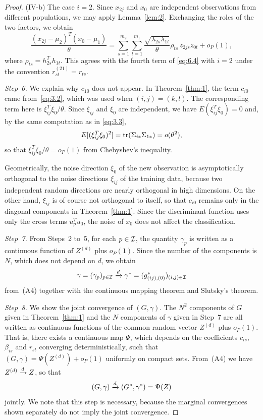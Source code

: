 \begin{proof}
(IV-b) The case $i=2$. Since $x_{2j}$ and $x_0$ are independent observations from
different populations, we may apply Lemma~\ref{lem:2}. Exchanging the roles of the
two factors, we obtain
\[
\frac{(x_{2j}-\mu_2)^T(x_0-\mu_1)}{\theta}
=\sum_{s=1}^{m_2}\sum_{t=1}^{m_1}\frac{\sqrt{\lambda_{2s}\lambda_{1t}}}{\theta}
\rho_{ts}\,z_{2js}z_{0t}+o_P(1),
\]
where $\rho_{ts}=h_{2s}^Th_{1t}$. This agrees with the fourth term of
\eqref{eq:6.4} with $i=2$ under the convention $r_{st}^{(21)}=r_{ts}$.

\textit{Step~6.} We explain why $c_{10}$ does not appear. In Theorem~\ref{thm:1},
the term $c_{i0}$ came from~\eqref{eq:3.2}, which was used when $(i,j)=(k,l)$. The
corresponding term here is $\xi_{ij}^T\xi_0/\theta$. Since $\xi_{ij}$ and $\xi_0$
are independent, we have $E(\xi_{ij}^T\xi_0)=0$ and, by the same computation as in
\eqref{eq:3.3},
\[
E[(\xi_{ij}^T\xi_0)^2]=\operatorname{tr}(\Sigma_{i*}\Sigma_{1*})=o(\theta^2),
\]
so that $\xi_{ij}^T\xi_0/\theta=o_P(1)$ from Chebyshev's inequality.

Geometrically, the noise direction $\xi_0$ of the new observation is asymptotically
orthogonal to the noise directions $\xi_{ij}$ of the training data, because two
independent random directions are nearly orthogonal in high dimensions. On the
other hand, $\xi_{ij}$ is of course not orthogonal to itself, so that $c_{i0}$
remains only in the diagonal components in Theorem~\ref{thm:1}. Since the
discriminant function uses only the cross terms $u_p^Tu_0$, the noise of $x_0$
does not affect the classification.

\textit{Step~7.} From Steps~2 to~5, for each $p\in\mathcal{I}$, the quantity $\gamma_p$ is
written as a continuous function of $Z^{(d)}$ plus $o_P(1)$. Since the number of
the components is $N$, which does not depend on $d$, we obtain
\begin{equation}
\gamma=(\gamma_p)_{p\in\mathcal{I}}\xrightarrow{d}\gamma^*=(g_{(ij),(0)}^*)_{(i,j)\in\mathcal{I}}
\label{eq:6.6}
\end{equation}
from~(A4) together with the continuous mapping theorem and Slutsky's theorem.

\textit{Step~8.} We show the joint convergence of $(G,\gamma)$. The $N^2$
components of $G$ given in Theorem~\ref{thm:1} and the $N$ components of $\gamma$
given in Step~7 are all written as continuous functions of the common random
vector $Z^{(d)}$ plus $o_P(1)$. That is, there exists a continuous map $\Psi$,
which depends on the coefficients $c_{is}$, $\beta_{is}$ and $r_{st}$ converging
deterministically, such that $(G,\gamma)=\Psi(Z^{(d)})+o_P(1)$ uniformly on
compact sets. From~(A4) we have $Z^{(d)}\xrightarrow{d} Z$, so that
\begin{equation}
(G,\gamma)\xrightarrow{d}(G^*,\gamma^*)=\Psi(Z)
\label{eq:6.7}
\end{equation}
jointly. We note that this step is necessary, because the marginal convergences
shown separately do not imply the joint convergence.


\end{proof}
